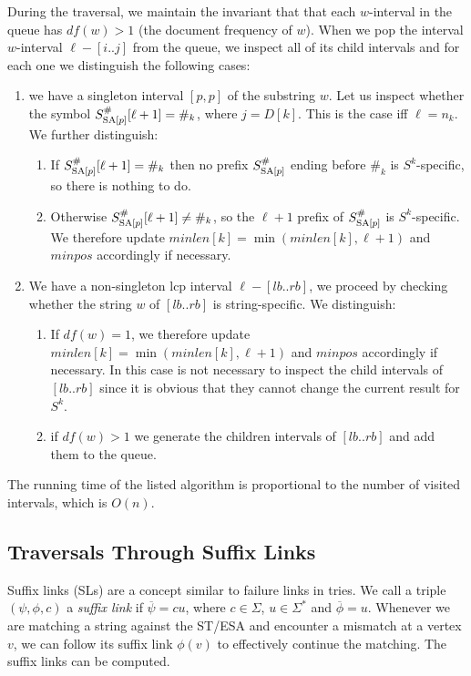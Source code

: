 During the traversal, we maintain the invariant that that each $w$-interval in the queue has $df(w) > 1$ (the document frequency of $w$).
When we pop the interval $w$-interval $\ell-[i..j]$ from the queue, we inspect all of its child intervals and for each one we distinguish the following cases:
\begin{enumerate}
    \item we have a singleton interval $[p, p]$ of the substring $w$.
    Let us inspect whether the symbol $S_{\text{SA}[p]}^{\#}[\ell+1] = \#_k$, where $j = D[k]$. This is the case iff $\ell = n_k$. We further distinguish:
    \begin{enumerate}
        \item If $S_{\text{SA}[p]}^{\#}[\ell+1] = \#_k$ then no prefix $S_{\text{SA}[p]}^{\#}$ ending before $\#_k$ is $S^k$-specific, so there is nothing to do.
        \item Otherwise $S_{\text{SA}[p]}^{\#}[\ell+1] \neq \#_k$, so the $\ell+1$ prefix of $S_{\text{SA}[p]}^{\#}$ is $S^k$-specific. We therefore update $minlen[k] = \min(minlen[k], \ell+1)$ and $minpos$ accordingly if necessary.
    \end{enumerate}
    \item We have a non-singleton lcp interval $\ell-[lb..rb]$, we proceed by checking whether the string $w$ of $[lb..rb]$ is string-specific. We distinguish:
    \begin{enumerate}
        \item If $df(w) = 1$, we therefore update $minlen[k] = \min(minlen[k], \ell+1)$ and $minpos$ accordingly if necessary.
        In this case is not necessary to inspect the child intervals of $[lb..rb]$ since it is obvious that they cannot change the current result for $S^k$.
        \item if $df(w) > 1$ we generate the children intervals of $[lb..rb]$ and add them to the queue.
    \end{enumerate}
\end{enumerate}

The running time of the listed algorithm is proportional to the number of visited intervals, which is $O(n)$.

\hypertarget{traversals-through-suffix-links}{%
\subsection{Traversals Through Suffix Links}\label{traversals-through-suffix-links}}

Suffix links (SLs) are a concept similar to failure links in tries.
We call a triple $(\psi, \phi, c)$ a \textit{suffix link} if $\overline{\psi} = cu$, where $c \in \Sigma$, $u \in \Sigma^*$ and $\overline{\phi} = u$.
Whenever we are matching a string against the ST/ESA and encounter a mismatch at a vertex $v$, we can follow its suffix link $\phi(v)$ to effectively continue the matching. The suffix links can be computed.

